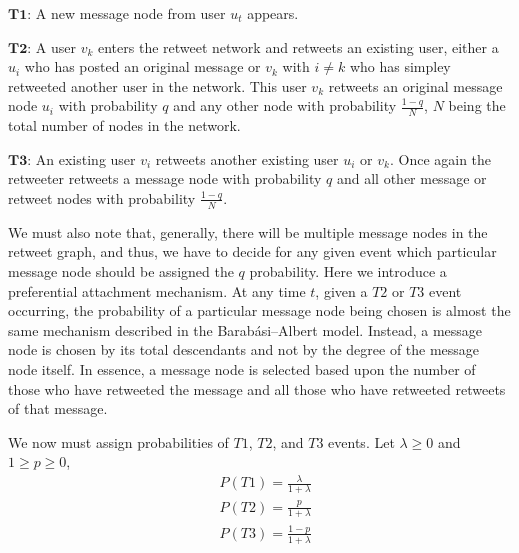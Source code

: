 \vspace{3mm}
$\pmb{T1}$: A new message node from user $u_t$ appears.

\vspace{3mm}
$\pmb{T2}$: A user $v_k$ enters the retweet network and retweets an existing user, either a $u_i$ who has posted an original message or $v_k$ with $i \neq k$ who
has simpley retweeted another user in the network. This user $v_k$ retweets an original message node $u_i$ with 
probability $q$ and any other node with probability $\frac{1-q}{N}$, $N$ being the total number of nodes in the network.

\vspace{3mm}
$\pmb{T3}$: An existing user $v_i$ retweets another existing user $u_i$ or $v_k$. Once again the retweeter retweets a message node with probability 
$q$ and all other message or retweet nodes with probability $\frac{1-q}{N}$.

We must also note that, generally, there will be multiple message nodes in the retweet graph, and thus,
 we have to decide for any given event
which particular message node should be assigned the $q$ probability.
 Here we introduce a preferential attachment mechanism. At any time $t$,
given a $T2$ or $T3$ event occurring, the probability of a particular message node being chosen is almost the
same mechanism described in the Barabási–Albert model. Instead, a message node is chosen
by its total descendants and not by the degree of the message node itself. In essence, a message node
is selected based upon the number of those who have retweeted the message and all those who have retweeted
retweets of that message.


We now must assign probabilities of $T1$, $T2$, and $T3$ events. Let $\lambda \geq 0$ and $1 \geq p \geq 0$,
\begin{align*}
    &P(T1) = \frac{\lambda}{1 + \lambda} \\
    &P(T2) = \frac{p}{1 + \lambda} \\
    &P(T3) = \frac{1-p}{1 + \lambda} \\
\end{align*}



